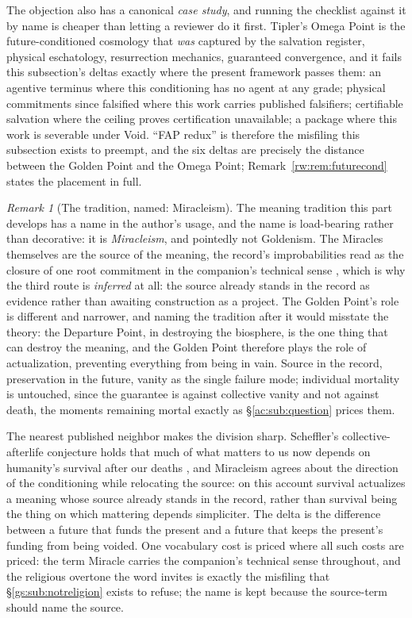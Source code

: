 \documentclass[11pt]{article}
\numberwithin{equation}{section}
\theoremstyle{plain}
\theoremstyle{definition}
\theoremstyle{remark}
\newtheorem{remark}[theorem]{Remark}
\begin{document}
The objection also has a canonical \emph{case study}, and running
the checklist against it by name is cheaper than letting a reviewer
do it first. Tipler's Omega Point \cite{Tipler94,BarrowTipler86} is
the future-conditioned cosmology that \emph{was} captured by the
salvation register, physical eschatology, resurrection mechanics,
guaranteed convergence, and it fails this subsection's deltas
exactly where the present framework passes them: an agentive terminus
where this conditioning has no agent at any grade; physical
commitments since falsified where this work carries published
falsifiers; certifiable salvation where the ceiling proves
certification unavailable; a package where this work is severable
under Void. ``FAP redux'' is therefore the misfiling this subsection
exists to preempt, and the six deltas are precisely the distance
between the Golden Point and the Omega Point;
Remark~\ref{rw:rem:futurecond} states the placement in full.

\begin{remark}[The tradition, named: Miracleism]
\label{gs:rem:miracleism}
The meaning tradition this part develops has a name in the author's
usage, and the name is load-bearing rather than decorative: it is
\emph{Miracleism}, and pointedly not Goldenism. The Miracles
themselves are the source of the meaning, the record's
improbabilities read as the closure of one root commitment in the
companion's technical sense \cite{Nexus}, which is why the third
route is \emph{inferred} at all: the source already stands in the
record as evidence rather than awaiting construction as a project.
The Golden Point's role is different and narrower, and naming the
tradition after it would misstate the theory: the Departure Point,
in destroying the biosphere, is the one thing that can destroy the
meaning, and the Golden Point therefore plays the role of
actualization, preventing everything from being in vain. Source in
the record, preservation in the future, vanity as the single failure
mode; individual mortality is untouched, since the guarantee is
against collective vanity and not against death, the moments
remaining mortal exactly as \S\ref{ac:sub:question} prices them.

The nearest published neighbor makes the division sharp. Scheffler's
collective-afterlife conjecture holds that much of what matters to
us now depends on humanity's survival after our deaths
\cite{Scheffler13}, and Miracleism agrees about the direction of the
conditioning while relocating the source: on this account survival
actualizes a meaning whose source already stands in the record,
rather than survival being the thing on which mattering depends
simpliciter. The delta is the difference between a future that
funds the present and a future that keeps the present's funding from
being voided. One vocabulary cost is priced where all such costs are
priced: the term Miracle carries the companion's technical sense
throughout, and the religious overtone the word invites is exactly
the misfiling that \S\ref{gs:sub:notreligion} exists to refuse; the
name is kept because the source-term should name the source.
\end{remark}
\end{document}
